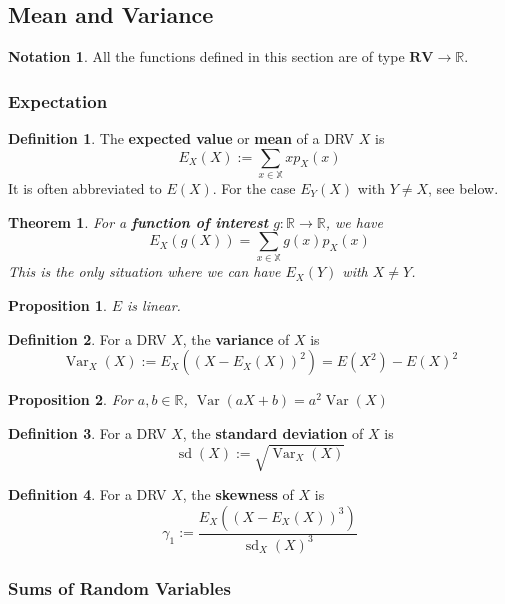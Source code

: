 \documentclass[12pt]{article}
\newtheorem{thm}{Theorem}[section]
\newtheorem*{prop*}{Proposition}
\theoremstyle{definition}
\newtheorem{defn}{Definition}[subsection]
\newtheorem*{not*}{Notation}
\newcommand{\R}{\mathbb{R}}
\newcommand{\X}{\mathbb{X}}
\newcommand{\RV}{\mathbf{RV}}
\DeclareMathOperator{\Var}{Var}
\DeclareMathOperator{\sd}{sd}
\begin{document}
\subsection{Mean and Variance}

\begin{not*}
  All the functions defined in this section are of type $\RV \to \R$.
\end{not*}

\subsubsection{Expectation}

\begin{defn}
  The \textbf{expected value} or \textbf{mean} of a DRV $X$ is
  $$E_X(X) := \sum_{x \in \X}xp_X(x)$$
  It is often abbreviated to $E(X)$.
  For the case $E_Y(X)$ with $Y \neq X$, see below.
\end{defn}


\begin{thm}
  For a \textbf{function of interest} $g : \R \to \R$, we have
  $$E_X(g(X)) = \sum_{x \in \X}g(x)p_X(x)$$
  This is the only situation where we can have $E_X(Y)$ with $X \neq Y$.
\end{thm}

\begin{prop*}
  $E$ is linear.
\end{prop*}


\begin{defn}
  For a DRV $X$, the \textbf{variance} of $X$ is
  $$\Var_X(X) := E_X\left((X - E_X(X))^2\right) = E(X^2) - E(X)^2$$
\end{defn}

\begin{prop*}
  For $a, b \in \R$, $\Var(aX + b) = a^2\Var(X)$
\end{prop*}

\begin{defn}
  For a DRV $X$, the \textbf{standard deviation} of $X$ is
  $$\sd(X) := \sqrt{\Var_X(X)}$$
\end{defn}

\begin{defn}
  For a DRV $X$, the \textbf{skewness} of $X$ is
  $$\gamma_1 := \frac{E_X((X - E_X(X))^3)}{\sd_X(X)^3}$$
\end{defn}

\subsubsection{Sums of Random Variables}
\end{document}
